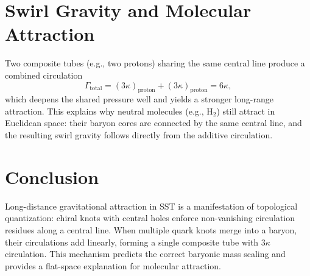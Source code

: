 \documentclass[reprint,aps,onecolumn,nofootinbib]{revtex4-2}
\begin{document}
%
%
%


\section{Swirl Gravity and Molecular Attraction}
Two composite tubes (e.g., two protons) sharing the same central line produce a combined circulation
\[
    \Gamma_{\mathrm{total}} = (3 \kappa)_{\mathrm{proton}} + (3 \kappa)_{\mathrm{proton}} = 6 \kappa,
\]
which deepens the shared pressure well and yields a stronger long-range attraction.
This explains why neutral molecules (e.g., H$_2$) still attract in Euclidean space: their baryon cores are connected by the same central line, and the resulting swirl gravity follows directly from the additive circulation.

\section{Conclusion}
Long-distance gravitational attraction in SST is a manifestation of topological quantization: chiral knots with central holes enforce non-vanishing circulation residues along a central line.
When multiple quark knots merge into a baryon, their circulations add linearly, forming a single composite tube with $3\kappa$ circulation.
This mechanism predicts the correct baryonic mass scaling and provides a flat-space explanation for molecular attraction.



\nocite{*}


\end{document}
